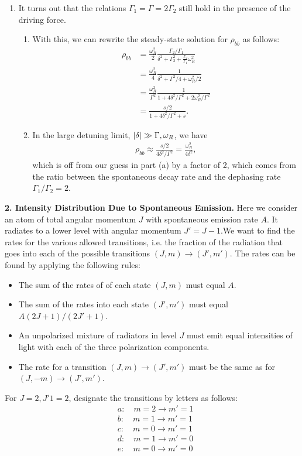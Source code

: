 \documentclass{article}
\theoremstyle{definition}
\newcommand{\f}[2]{\frac{#1}{#2}}
\begin{document}
\begin{enumerate}[label=(\alph*)]
	
	\item It turns out that the relations $\Gamma_1 = \Gamma = 2\Gamma_2 $ still hold in the presence of the driving force. 
	
	
	\begin{enumerate}[label=(\roman*)]
		\item With this, we can rewrite the steady-state solution for $\rho_{bb}$ as follows:
		\begin{align*}
		\rho_{bb} &= \f{\omega_R^2}{2}\f{\Gamma_2/\Gamma_1}{\delta^2 + \Gamma_2^2 + \f{\Gamma_2}{\Gamma_1}\omega_R^2}\\
		&= \f{\omega_R^2}{4}\f{1}{\delta^2 + \Gamma^2/4 + \omega_R^2/2}\\
		&= \f{\omega_R^2}{\Gamma^2}\f{1}{1 + 4\delta^2/\Gamma^2 + 2\omega_R^2/\Gamma^2}\\
		&= \f{s/2}{1+4\delta^2/\Gamma^2 + s}.
		\end{align*}
		
		
		
		\item In the large detuning limit, $\abs{\delta} \gg \Gamma, \omega_R$, we have
		\begin{align*}
		\rho_{bb} \approx \f{s/2}{4\delta^2/\Gamma^2} = \f{\omega_R^2}{4\delta^2},
		\end{align*}
		which is off from our guess in part (a) by a factor of 2, which comes from the ratio between the spontaneous decay rate and the dephasing rate $\Gamma_1/\Gamma_2 = 2$. 
	\end{enumerate}
\end{enumerate}


\noindent \textbf{2. Intensity Distribution Due to Spontaneous Emission. } Here we consider an atom of total angular momentum $J$ with spontaneous emission rate $A$. It radiates to a lower level with angular momentum $J' = J-1$.We want to find the rates for the various allowed transitions, i.e. the fraction of the radiation that goes into each of the possible transitions $(J,m) \to (J',m')$. The rates can be found by applying the following rules:
\begin{itemize}
	\item The sum of the rates of of each state $(J,m)$ must equal $A$.
	\item The sum of the rates into each state $(J',m')$ must equal $A(2J+1)/(2J'+1)$.
	\item An unpolarized mixture of radiators in level $J$ must emit equal intensities of light with each of the three polarization components.
	\item The rate for a transition $(J,m)\to (J',m')$ must be the same as for $(J,-m)\to (J',m')$.
\end{itemize}
For $J=2,J'1=2$, designate the transitions by letters as follows:
\begin{align*}
&a:\quad m=2 \to m'=1\\
&b:\quad m=1 \to m'=1\\
&c:\quad m=0 \to m'=1\\
&d:\quad m=1\to m'=0\\
&e:\quad m=0 \to m'=0
\end{align*}
\end{document}

